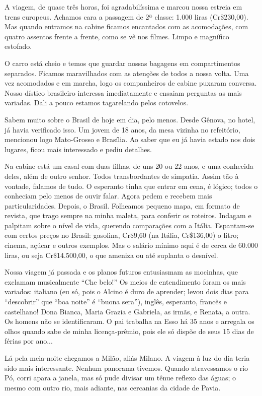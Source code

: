 A viagem, de quase três horas, foi agradabilíssima e marcou nossa estreia em trens europeus. Achamos cara a passagem de 2ª classe: 1.000 liras (Cr\$230,00). Mas quando entramos na cabine ficamos encantados com as acomodações, com quatro assentos frente a frente, como se vê nos filmes. Limpo e magnífico estofado.

O carro está cheio e temos que guardar nossas bagagens em compartimentos separados. Ficamos maravilhados com as atenções de todos a nossa volta. Uma vez acomodados e em marcha, logo os companheiros de cabine puxaram conversa. Nosso dístico brasileiro interessa imediatamente e ensaiam perguntas as mais variadas. Dali a pouco estamos tagarelando pelos cotovelos.

Sabem muito sobre o Brasil de hoje em dia, pelo menos. Desde Gênova, no hotel, já havia verificado isso. Um jovem de 18 anos, da mesa vizinha no refeitório, mencionou logo Mato-Grosso e Brasília. Ao saber que eu já havia estado nos dois lugares, ficou mais interessado e pediu detalhes.

Na cabine está um casal com duas filhas, de uns 20 ou 22 anos, e uma conhecida deles, além de outro senhor. Todos transbordantes de simpatia. Assim tão à vontade, falamos de tudo. O esperanto tinha que entrar em cena, é lógico; todos o conheciam pelo menos de ouvir falar. Agora pedem e recebem mais particularidades. Depois, o Brasil. Folheamos pequeno mapa, em formato de revista, que trago sempre na minha maleta, para conferir os roteiros. Indagam e palpitam sobre o nível de vida, querendo comparações com a Itália. Espantam-se com certos preços no Brasil: gasolina, Cr\$9,60 (na Itália, Cr\$136,00) o litro; cinema, açúcar e outros exemplos. Mas o salário mínimo aqui é de cerca de 60.000 liras, ou seja Cr\$14.500,00, o que ameniza ou até suplanta o desnível.

Nossa viagem já passada e os planos futuros entusiasmam as mocinhas, que exclamam musicalmente ``Che belo!'' Os meios de entendimento foram os mais variados: italiano (eu só, pois o Alcino é duro de aprender; levou dois dias para ``descobrir'' que ``boa noite'' é ``buona sera''), inglês, esperanto, francês e castelhano! Dona Bianca, Maria Grazia e Gabriela, as irmãs, e Renata, a outra. Os homens não se identificaram. O pai trabalha na Esso há 35 anos e arregala os olhos quando sabe de minha licença-prêmio, pois ele só dispõe de seus 15 dias de férias por ano...

Lá pela meia-noite chegamos a Milão, aliás Milano. A viagem à luz do dia teria sido mais interessante. Nenhum panorama tivemos. Quando atravessamos o rio Pó, corri apara a janela, mas só pude divisar um tênue reflexo das águas; o mesmo com outro rio, mais adiante, nas cercanias da cidade de Pavia.

